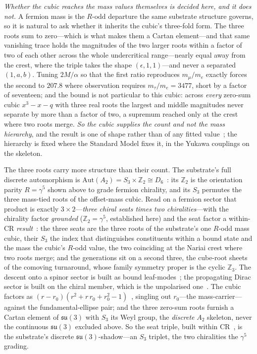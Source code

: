 \documentclass[11pt]{article}
\theoremstyle{plain}
\theoremstyle{remark}
\begin{document}
\emph{Whether the cubic reaches the mass values themselves is decided here, and it does not.} A fermion mass is the $R$-odd departure the same substrate structure governs, so it is natural to ask whether it inherits the cubic's three-fold form. The three roots sum to zero---which is what makes them a Cartan element---and that same vanishing trace holds the magnitudes of the two larger roots within a factor of two of each other across the whole undercritical range---nearly equal away from the crest, where the triple takes the shape $(\epsilon,1,1)$---and never a separated $(1,a,b)$. Tuning $2M/\alpha$ so that the first ratio reproduces $m_\mu/m_e$ exactly forces the second to $207.8$ where observation requires $m_\tau/m_e=3477$, short by a factor of seventeen; and the bound is not particular to this cubic: across \emph{every} zero-sum cubic $x^3-x-q$ with three real roots the largest and middle magnitudes never separate by more than a factor of two, a supremum reached only at the crest where two roots merge. \emph{So the cubic supplies the count and not the mass hierarchy}, and the result is one of shape rather than of any fitted value~; the hierarchy is fixed where the Standard Model fixes it, in the Yukawa couplings on the skeleton.

The three roots carry more structure than their count. The substrate's full discrete automorphism is $\mathrm{Aut}(A_2)=S_3\times\mathbb{Z}_2\cong D_6$~\cite{JanzenAlgebroid}: its $\mathbb{Z}_2$ is the orientation parity $R=\gamma^5$ shown above to grade fermion chirality, and its $S_3$ permutes the three mass-tied roots of the offset-mass cubic. Read on a fermion sector that product is exactly $3\times2$---\emph{three chiral seats times two chiralities}---with the chirality factor \emph{grounded} ($\mathbb{Z}_2=\gamma^5$, established here) and the seat factor a within-CR \emph{result}~\cite{JanzenMatter}: the three seats are the three roots of the substrate's one $R$-odd mass cubic, their $S_3$ the index that distinguishes constituents within a bound state and the mass the cubic's $R$-odd value, the two coinciding at the Nariai crest where two roots merge; and the generations sit on a second three, the cube-root sheets of the comoving turnaround, whose family symmetry proper is the cyclic $\mathbb{Z}_3$. The descent onto a spinor sector is built as bound leaf-modes~\cite{JanzenMatter}; the propagating Dirac sector is built on the chiral member, which is the unpolarised one~\cite{JanzenDynamics}. The cubic factors as $(r-r_0)(r^2+r\,r_0+r_0^2-1)$~\cite{JanzenAlgebroid}, singling out $r_0$---the mass-carrier---against the fundamental-ellipse pair; and the three zero-sum roots furnish a Cartan element of $\mathfrak{su}(3)$ with $S_3$ its Weyl group, the \emph{discrete} $A_2$ skeleton, never the continuous $\mathfrak{su}(3)$ excluded above. So the seat triple, built within CR~\cite{JanzenMatter}, is the substrate's discrete $\mathfrak{su}(3)$-shadow---an $S_3$ triplet, the two chiralities the $\gamma^5$ grading.
\end{document}
